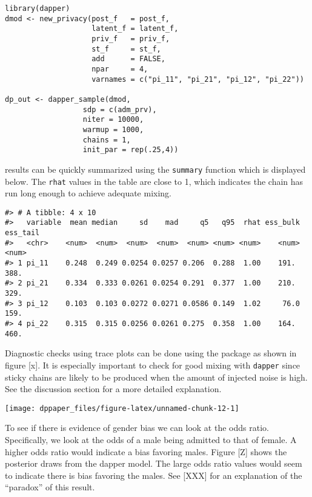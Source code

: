 \begin{verbatim}
library(dapper)
dmod <- new_privacy(post_f   = post_f,
                    latent_f = latent_f,
                    priv_f   = priv_f,
                    st_f     = st_f,
                    add      = FALSE,
                    npar     = 4,
                    varnames = c("pi_11", "pi_21", "pi_12", "pi_22"))
                  
dp_out <- dapper_sample(dmod,
                  sdp = c(adm_prv),
                  niter = 10000,
                  warmup = 1000,
                  chains = 1,
                  init_par = rep(.25,4))
\end{verbatim}

results can be quickly summarized using the \texttt{summary} function which is
displayed below. The \texttt{rhat} values in the table are close to 1, which indicates
the chain has run long enough to achieve adequate mixing.

\begin{verbatim}
#> # A tibble: 4 x 10
#>   variable  mean median     sd    mad     q5   q95  rhat ess_bulk ess_tail
#>   <chr>    <num>  <num>  <num>  <num>  <num> <num> <num>    <num>    <num>
#> 1 pi_11    0.248  0.249 0.0254 0.0257 0.206  0.288  1.00    191.      388.
#> 2 pi_21    0.334  0.333 0.0261 0.0254 0.291  0.377  1.00    210.      329.
#> 3 pi_12    0.103  0.103 0.0272 0.0271 0.0586 0.149  1.02     76.0     159.
#> 4 pi_22    0.315  0.315 0.0256 0.0261 0.275  0.358  1.00    164.      460.
\end{verbatim}

Diagnostic checks using trace plots can be done using the  package
as shown in figure {[}x{]}. It is especially important to check for good mixing
with \texttt{dapper} since sticky chains are likely to be produced
when the amount of injected noise is high. See the discussion section
for a more detailed explanation.

\begin{center}\texttt{[image: dppaper\_files/figure-latex/unnamed-chunk-12-1]} \end{center}

To see if there is evidence of gender bias we can look at the odds ratio.
Specifically, we look at the odds of a male being admitted to
that of female. A higher odds ratio would indicate a bias
favoring males. Figure {[}Z{]} shows the posterior draws
from the dapper model. The large odds ratio values would seem
to indicate there is bias favoring the males. See {[}XXX{]} for
an explanation of the ``paradox'' of this result.

